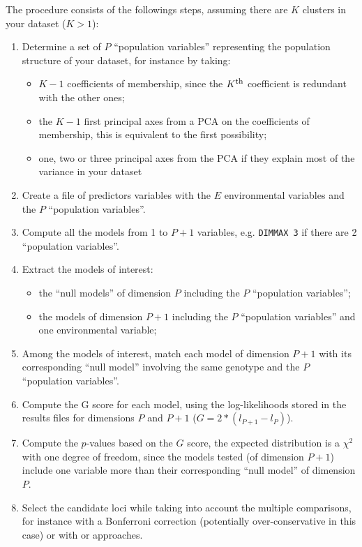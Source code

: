 \documentclass[a4paper,11pt]{article}
\begin{document}
The procedure consists of the followings steps, assuming there are $K$ clusters in your dataset ($K>1$):
\begin{enumerate}
\item{Determine a set of $P$ \enquote{population variables} representing the population structure of your dataset, for instance by taking:
\begin{itemize}
\item{$K-1$ coefficients of membership, since the $K^{\mbox{\footnotesize th}}$ coefficient is redundant with the other ones;}
\item{the $K-1$ first principal axes from a PCA on the coefficients of membership, this is equivalent to the first possibility;}
\item{one, two or three principal axes from the PCA if they explain most of the variance in your dataset}
\end{itemize}}
\item{Create a file of predictors variables with the $E$ environmental variables and the $P$ \enquote{population variables}.}
\item{Compute all the models from 1 to $P+1$ variables, e.g. \texttt{DIMMAX 3} if there are 2 \enquote{population variables}.}
\item{Extract the models of interest: 
\begin{itemize}
\item{the \enquote{null models} of dimension $P$ including the $P$ \enquote{population variables};}
\item{the models of dimension $P+1$ including the $P$ \enquote{population variables} and one environmental variable;}
\end{itemize}}
\item{Among the models of interest, match each model of dimension $P+1$ with its corresponding \enquote{null model} involving the same genotype and the $P$ \enquote{population variables}.}
\item{Compute the G score for each model, using the log-likelihoods stored in the results files for dimensions $P$ and $P+1$ ($G = 2*(l_{P+1}-l_P)$).}
\item{Compute the $p$-values based on the $G$ score, the expected distribution is a $\chi^2$ with one degree of freedom, since the models tested (of dimension $P+1$) include one variable more than their corresponding \enquote{null model} of dimension $P$.}
\item{Select the candidate loci while taking into account the multiple comparisons, for instance with a Bonferroni correction (potentially over-conservative in this case) or with \textcite{storey:2003} or \textcite{benjamini:1995} approaches.}
\end{enumerate}
\end{document}
